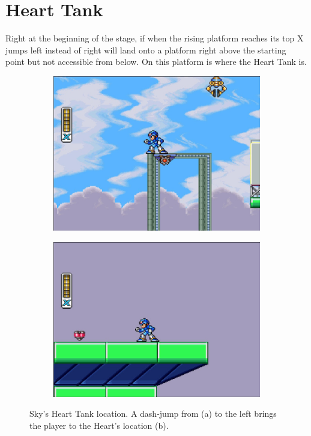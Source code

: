 \section{Heart Tank}
Right at the beginning of the stage, if when the rising platform reaches its top X jumps left instead of right will land onto a platform right above the starting point but not accessible from below. On this platform is where the Heart Tank is.
\begin{figure}[htp]
	\centering
	\begin{subfigure}{0.4\linewidth}
		\centering
		\includegraphics[width=\linewidth]{figures/X1/Storm_eagle/Storm_heart_1.jpg}
		\caption{}
	\end{subfigure}
	\begin{subfigure}{0.4\linewidth}
		\centering
		\includegraphics[width=\linewidth]{figures/X1/Storm_eagle/Storm_heart_2.jpg}
		\caption{}
	\end{subfigure}
	\caption{Sky's Heart Tank location. A dash-jump from (a) to the left brings the player to the Heart's location (b).}
\end{figure}

